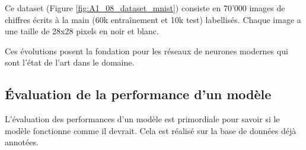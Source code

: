 Ce dataset (Figure \ref{fig:A1_08_dataset_mnist}) consiste en 70'000 images de chiffres écrits à la main (60k entraînement et 10k test) labellisés. Chaque image a une taille de 28x28 pixels en noir et blanc.

Ces évolutions posent la fondation pour les réseaux de neurones modernes qui sont l'état de l'art dans le domaine.

\subsection{Évaluation de la performance d'un modèle}
\label{subsec:evaluation_performance_modele}

L'évaluation des performances d'un modèle est primordiale pour savoir si le modèle fonctionne comme il devrait. Cela est réalisé sur la base de données déjà annotées.

